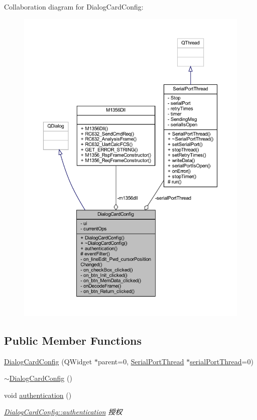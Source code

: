 Collaboration diagram for Dialog\+Card\+Config\+:
\nopagebreak
\begin{figure}[H]
\begin{center}
\leavevmode
\includegraphics[width=350pt]{class_dialog_card_config__coll__graph}
\end{center}
\end{figure}
\subsection*{Public Member Functions}
\begin{DoxyCompactItemize}
\item 
\mbox{\hyperlink{class_dialog_card_config_ac2fd1ef6027d881432914a2a9768757f}{Dialog\+Card\+Config}} (Q\+Widget $\ast$parent=0, \mbox{\hyperlink{class_serial_port_thread}{Serial\+Port\+Thread}} $\ast$\mbox{\hyperlink{class_dialog_card_config_a03f0f53a1f6324827d54b5cc334994a2}{serial\+Port\+Thread}}=0)
\item 
\mbox{\hyperlink{class_dialog_card_config_aca6a38d16e5c32d6e8c4bb54153b412c}{$\sim$\+Dialog\+Card\+Config}} ()
\item 
void \mbox{\hyperlink{class_dialog_card_config_a4d73ad9ea40ad536bdccce7cb5a985bc}{authentication}} ()
\begin{DoxyCompactList}\small\item\em \mbox{\hyperlink{class_dialog_card_config_a4d73ad9ea40ad536bdccce7cb5a985bc}{Dialog\+Card\+Config\+::authentication}} 授权 \end{DoxyCompactList}\end{DoxyCompactItemize}
